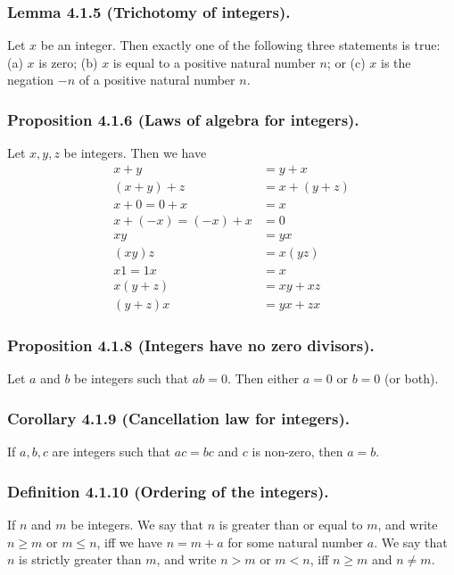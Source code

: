 \documentclass[12pt, letter]{article}
\begin{document}
\subsubsection*{Lemma 4.1.5 (Trichotomy of integers).}
Let $x$ be an integer. Then exactly one of the following three statements is true: (a) $x$ is zero;
(b) $x$ is equal to a positive natural number $n$; or (c) $x$ is the negation $-n$ of a positive natural number $n$.
\subsubsection*{Proposition 4.1.6 (Laws of algebra for integers).}
Let $x,y,z$ be integers. Then we have 
\begin{equation*}
    \begin{aligned}
        x+y&=y+x\\
        (x+y)+z&=x+(y+z)\\
        x+0=0+x&=x\\
        x+(-x)=(-x)+x&=0\\
        xy&=yx\\
        (xy)z&=x(yz)\\
        x1=1x&=x\\
        x(y+z)&=xy+xz\\
        (y+z)x&=yx+zx
    \end{aligned}
\end{equation*}
\subsubsection*{Proposition 4.1.8 (Integers have no zero divisors).}
Let $a$ and $b$ be integers such that $ab=0$. Then either $a=0$ or $b=0$ (or both).
\subsubsection*{Corollary 4.1.9 (Cancellation law for integers).}
If $a,b,c$ are integers such that $ac=bc$ and $c$ is non-zero, then $a=b$.
\subsubsection*{Definition 4.1.10 (Ordering of the integers).}
If $n$ and $m$ be integers. We say that $n$ is greater than or equal to $m$, and write $n\geq m$ or $m\leq n$,
iff we have $n=m+a$ for some natural number $a$. We say that $n$ is strictly greater than $m$,
and write $n>m$ or $m<n$, iff $n\geq m$ and $n\ne m$.
\end{document}
